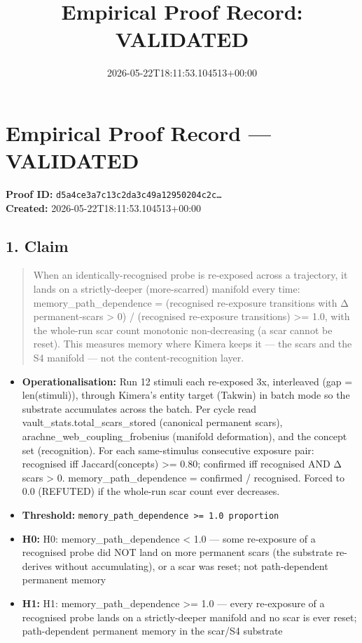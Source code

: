 \documentclass{article}
\title{Empirical Proof Record: VALIDATED}
\date{2026-05-22T18:11:53.104513+00:00}
\begin{document}
\maketitle
\section*{Empirical Proof Record --- \textcolor{validated}{\textbf{VALIDATED}}}
\textbf{Proof ID:} \texttt{d5a4ce3a7c13c2da3c49a12950204c2c\dots}\\
\textbf{Created:} 2026-05-22T18:11:53.104513+00:00
\subsection*{1. Claim}
\begin{quote}When an identically-recognised probe is re-exposed across a trajectory, it lands on a strictly-deeper (more-scarred) manifold every time: memory\_path\_dependence = (recognised re-exposure transitions with Δ permanent-scars > 0) / (recognised re-exposure transitions) >= 1.0, with the whole-run scar count monotonic non-decreasing (a scar cannot be reset). This measures memory where Kimera keeps it — the scars and the S4 manifold — not the content-recognition layer.\end{quote}
\begin{itemize}
\item \textbf{Operationalisation:} Run 12 stimuli each re-exposed 3x, interleaved (gap = len(stimuli)), through Kimera's entity target (Takwin) in batch mode so the substrate accumulates across the batch. Per cycle read vault\_stats.total\_scars\_stored (canonical permanent scars), arachne\_web\_coupling\_frobenius (manifold deformation), and the concept set (recognition). For each same-stimulus consecutive exposure pair: recognised iff Jaccard(concepts) >= 0.80; confirmed iff recognised AND Δ scars > 0. memory\_path\_dependence = confirmed / recognised. Forced to 0.0 (REFUTED) if the whole-run scar count ever decreases.
\item \textbf{Threshold:} \texttt{memory\_path\_dependence >= 1.0 proportion}
\item \textbf{H0:} H0: memory\_path\_dependence < 1.0 — some re-exposure of a recognised probe did NOT land on more permanent scars (the substrate re-derives without accumulating), or a scar was reset; not path-dependent permanent memory
\item \textbf{H1:} H1: memory\_path\_dependence >= 1.0 — every re-exposure of a recognised probe lands on a strictly-deeper manifold and no scar is ever reset; path-dependent permanent memory in the scar/S4 substrate
\end{itemize}
\end{document}
